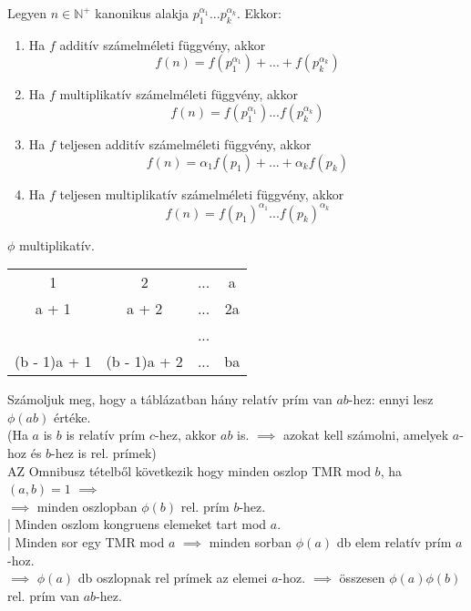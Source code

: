 \documentclass{beamer}
\begin{document}
\begin{frame}

\begin{tcolorbox}[title={Tétel: Számelméleti függvények}]
Legyen $n \in \mathbb{N}^+$ kanonikus alakja $p_1^{{\alpha}_1}...p_k^{{\alpha}_k}$. Ekkor:\\
\begin{enumerate}
\item Ha $f$ additív számelméleti függvény, akkor $$f(n) = f(p_1^{{\alpha}_1}) + ... + f(p_k^{{\alpha}_k})$$
\item Ha $f$ multiplikatív számelméleti függvény, akkor $$f(n) = f(p_1^{{\alpha}_1})...f(p_k^{{\alpha}_k})$$
\item Ha $f$ teljesen additív számelméleti függvény, akkor $$f(n) = {\alpha}_1f(p_1) + ... + {\alpha}_kf(p_k)$$
\item Ha $f$ teljesen multiplikatív számelméleti függvény, akkor $$f(n) = f(p_1)^{{\alpha}_1}...f(p_k)^{{\alpha}_k}$$
\end{enumerate}

\end{tcolorbox}

\end{frame}

\begin{frame}

\begin{tcolorbox}[title={Tétel: $\phi$ multiplikativitása}]
$\phi$ multiplikatív.
\end{tcolorbox}

\begin{tcolorbox}[title={Bizonyítás}]
\smallskip
\begin{tabular}{c c c c}
1 & 2 & ... & a \\
a + 1 & a + 2 & ... & 2a\\
 &  & ... &  \\
(b - 1)a + 1 & (b - 1)a + 2 & ... & ba
\end{tabular}
\smallskip
Számoljuk meg, hogy a táblázatban hány relatív prím van $ab$-hez: ennyi lesz ${\phi}(ab)$ értéke.\\
(Ha $a$ is $b$ is relatív prím $c$-hez, akkor $ab$ is. $\implies$ azokat kell számolni, amelyek $a$-hoz és $b$-hez is rel. prímek)\\
\smallskip
AZ Omnibusz tételből következik hogy minden oszlop TMR mod $b$, ha $(a, b) = 1$ $\implies$\\
$\implies$ minden oszlopban ${\phi}(b)$ rel. prím $b$-hez.\\
\smallskip
| Minden oszlom kongruens elemeket tart mod $a$.\\
| Minden sor egy TMR mod $a$ $\implies$ minden sorban ${\phi}(a)$ db elem relatív prím $a$-hoz.\\
$\implies$ ${\phi}(a)$ db oszlopnak rel prímek az elemei $a$-hoz. $\implies$ összesen ${\phi}(a){\phi}(b)$ rel. prím van $ab$-hez.

\end{tcolorbox}

\end{frame}
\end{document}

